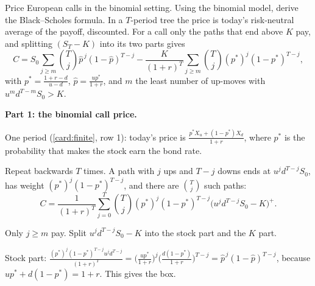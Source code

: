 \begin{problem}[Q2(a)]
Price European calls in the binomial setting. Using the binomial model, derive the Black--Scholes formula.
\cardsays In a $T$-period tree the price is today's risk-neutral average of the payoff, discounted. For a call only the paths that end above $K$ pay, and splitting $(S_T-K)$ into its two parts gives
\[
C=S_0\sum_{j\ge m}\binom Tj\hat p^{\,j}(1-\hat p)^{T-j}-\frac{K}{(1+r)^T}\sum_{j\ge m}\binom Tj(p^*)^j(1-p^*)^{T-j},
\]
with $p^*=\frac{1+r-d}{u-d}$, $\hat p=\frac{up^*}{1+r}$, and $m$ the least number of up-moves with $u^md^{T-m}S_0>K$.

\textbf{Part 1: the binomial call price.}
\begin{steps}
\item One period (\cref{card:finite}, row 1): today's price is $\frac{p^*X_u+(1-p^*)X_d}{1+r}$, where $p^*$ is the probability that makes the stock earn the bond rate.
\item Repeat backwards $T$ times. A path with $j$ ups and $T-j$ downs ends at $u^jd^{T-j}S_0$, has weight $(p^*)^j(1-p^*)^{T-j}$, and there are $\binom Tj$ such paths:
\[
C=\frac1{(1+r)^T}\sum_{j=0}^T\binom Tj(p^*)^j(1-p^*)^{T-j}\big(u^jd^{T-j}S_0-K\big)^+.
\]
\item Only $j\ge m$ pay. Split $u^jd^{T-j}S_0-K$ into the stock part and the $K$ part.
\item Stock part: $\frac{(p^*)^j(1-p^*)^{T-j}u^jd^{T-j}}{(1+r)^T}=\Big(\frac{up^*}{1+r}\Big)^j\Big(\frac{d(1-p^*)}{1+r}\Big)^{T-j}=\hat p^{\,j}(1-\hat p)^{T-j}$, because $up^*+d(1-p^*)=1+r$. This gives the box.
\end{steps}


\end{problem}
